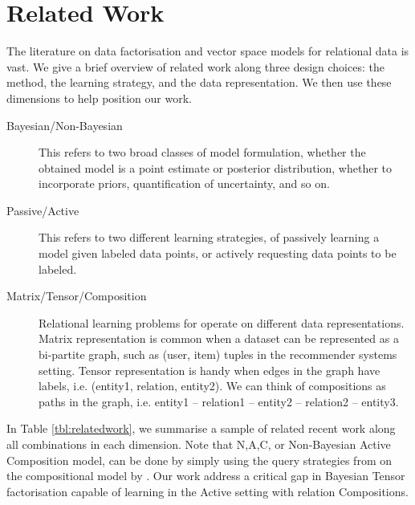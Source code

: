
\section{Related Work}

The literature on data factorisation and vector space models for 
relational data is vast. 
We give a brief overview of related work along three design choices:
the method, the learning strategy, and the data representation. 
We then use these dimensions to help position our work. 
\begin{description}
\item[Bayesian/Non-Bayesian] This refers to two broad classes of model 
formulation, whether the obtained model is a point estimate or posterior 
distribution, whether to incorporate priors, quantification of uncertainty, 
and so on. 
\item[Passive/Active] This refers to two different learning strategies, 
of passively learning a model given labeled data points, or actively 
requesting data points to be labeled.
\item[Matrix/Tensor/Composition] Relational learning problems for operate on 
different data representations. Matrix representation is common when a dataset 
can be represented as a bi-partite graph, such as (user, item) tuples in the 
recommender systems setting. Tensor representation is handy when edges in the 
graph have labels, i.e. (entity1, relation, entity2). We can think of 
compositions as paths in the graph, i.e. entity1 -- relation1 -- entity2 -- 
relation2 -- entity3.
\end{description}
In Table \ref{tbl:relatedwork}, we summarise a sample of related recent work 
along all combinations in each dimension. 
Note that N,A,C, or Non-Bayesian Active Composition model, can be done by 
simply using the query strategies from \citet{kajino2015active} on the 
compositional model by \citet{guu2015traversing}. Our work address a critical gap 
in Bayesian Tensor factorisation capable of learning in the 
Active setting with relation Compositions.


